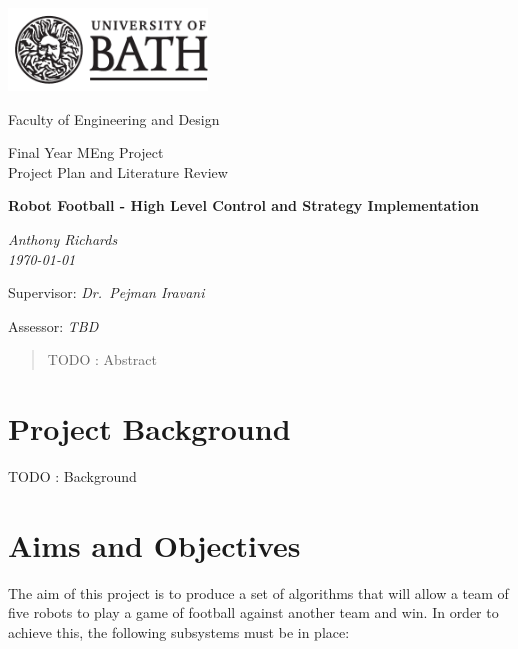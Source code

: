 \documentclass[a4paper,10pt]{article}
\begin{document}
\begin{titlepage}
  \setlength{\parindent}{0cm}

  \includegraphics[width=200px]{Images/uob-logo-black-transparent}

  \Large
  Faculty of Engineering and Design

  \vspace{80pt}

  \LARGE
  Final Year MEng Project \\
  Project Plan and Literature Review

  \vspace{80pt}
  \textbf{Robot Football - High Level Control and Strategy Implementation}

  \vspace{10pt}
  \emph{Anthony Richards} \\
  \emph{\today}

  \vspace{80pt}
  Supervisor: \emph{Dr.~Pejman Iravani}

  \vspace{10pt}
  Assessor: \emph{TBD}
\end{titlepage}


\begin{abstract}
TODO : Abstract
\end{abstract}

\tableofcontents

\cleardoublepage


\section{Project Background}
TODO : Background

\section{Aims and Objectives}
The aim of this project is to produce a set of algorithms that will allow a team of five robots to play a game of football against another team and win.  In order to achieve this, the following subsystems must be in place:
\end{document}

